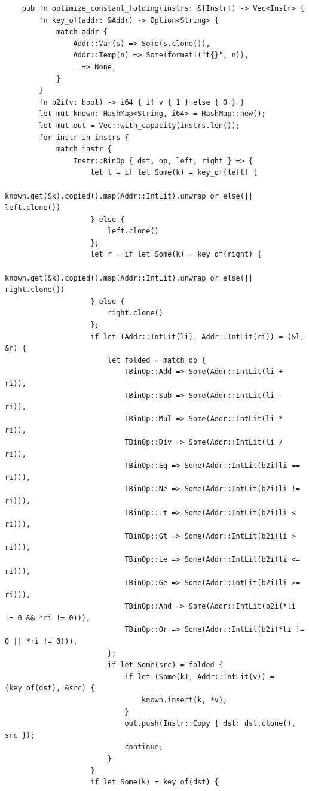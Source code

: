 \documentclass[11pt]{article}
\begin{document}
\begin{verbatim}
    pub fn optimize_constant_folding(instrs: &[Instr]) -> Vec<Instr> {
        fn key_of(addr: &Addr) -> Option<String> {
            match addr {
                Addr::Var(s) => Some(s.clone()),
                Addr::Temp(n) => Some(format!("t{}", n)),
                _ => None,
            }
        }
        fn b2i(v: bool) -> i64 { if v { 1 } else { 0 } }
        let mut known: HashMap<String, i64> = HashMap::new();
        let mut out = Vec::with_capacity(instrs.len());
        for instr in instrs {
            match instr {
                Instr::BinOp { dst, op, left, right } => {
                    let l = if let Some(k) = key_of(left) {
                        known.get(&k).copied().map(Addr::IntLit).unwrap_or_else(|| left.clone())
                    } else {
                        left.clone()
                    };
                    let r = if let Some(k) = key_of(right) {
                        known.get(&k).copied().map(Addr::IntLit).unwrap_or_else(|| right.clone())
                    } else {
                        right.clone()
                    };
                    if let (Addr::IntLit(li), Addr::IntLit(ri)) = (&l, &r) {
                        let folded = match op {
                            TBinOp::Add => Some(Addr::IntLit(li + ri)),
                            TBinOp::Sub => Some(Addr::IntLit(li - ri)),
                            TBinOp::Mul => Some(Addr::IntLit(li * ri)),
                            TBinOp::Div => Some(Addr::IntLit(li / ri)),
                            TBinOp::Eq => Some(Addr::IntLit(b2i(li == ri))),
                            TBinOp::Ne => Some(Addr::IntLit(b2i(li != ri))),
                            TBinOp::Lt => Some(Addr::IntLit(b2i(li < ri))),
                            TBinOp::Gt => Some(Addr::IntLit(b2i(li > ri))),
                            TBinOp::Le => Some(Addr::IntLit(b2i(li <= ri))),
                            TBinOp::Ge => Some(Addr::IntLit(b2i(li >= ri))),
                            TBinOp::And => Some(Addr::IntLit(b2i(*li != 0 && *ri != 0))),
                            TBinOp::Or => Some(Addr::IntLit(b2i(*li != 0 || *ri != 0))),
                        };
                        if let Some(src) = folded {
                            if let (Some(k), Addr::IntLit(v)) = (key_of(dst), &src) {
                                known.insert(k, *v);
                            }
                            out.push(Instr::Copy { dst: dst.clone(), src });
                            continue;
                        }
                    }
                    if let Some(k) = key_of(dst) {

\end{verbatim}
\end{document}
